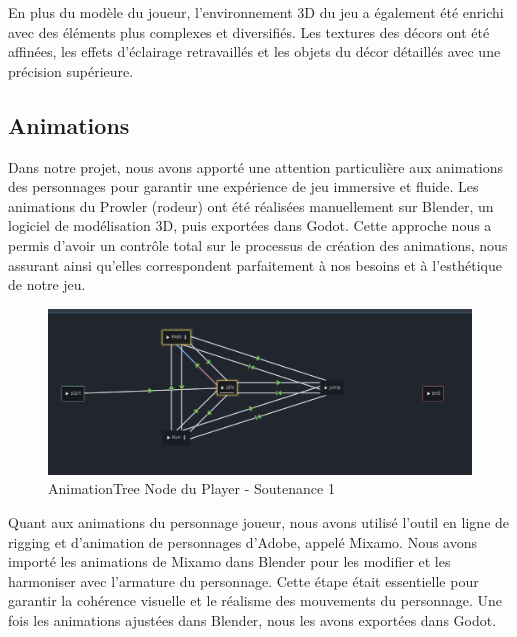 \documentclass[
	article,			%
	11pt,				%
	oneside,			%
	a4paper,			%
	chapter=TITLE,
	french,			%
	sumario=tradicional
	]{base_nt}
\begin{document}
En plus du modèle du joueur, l'environnement 3D du jeu a également été enrichi avec des éléments plus complexes et diversifiés. Les textures des décors ont été affinées, les effets d'éclairage retravaillés et les objets du décor détaillés avec une précision supérieure.

\newpage

\subsection{Animations}

Dans notre projet, nous avons apporté une attention particulière aux animations des personnages pour garantir une expérience de jeu immersive et fluide. Les animations du Prowler (rodeur) ont été réalisées manuellement sur Blender, un logiciel de modélisation 3D, puis exportées dans Godot. Cette approche nous a permis d'avoir un contrôle total sur le processus de création des animations, nous assurant ainsi qu'elles correspondent parfaitement à nos besoins et à l'esthétique de notre jeu.

\begin{figure}[ht]
	\caption{AnimationTree Node du Player - Soutenance 1}
	\centering
	\includegraphics[width=1\linewidth]{paper4.png}
	\legend{}
	
\end{figure}

Quant aux animations du personnage joueur, nous avons utilisé l'outil en ligne de rigging et d'animation de personnages d'Adobe, appelé Mixamo. Nous avons importé les animations de Mixamo dans Blender pour les modifier et les harmoniser avec l'armature du personnage. Cette étape était essentielle pour garantir la cohérence visuelle et le réalisme des mouvements du personnage. Une fois les animations ajustées dans Blender, nous les avons exportées dans Godot.
\end{document}
